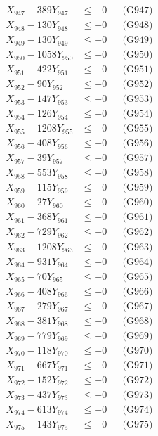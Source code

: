 \documentclass[a4paper,10pt]{article}
\begin{document}
{\begin{align}
X_{947} - 389Y_{947} &\leq +0 && \text{(G947)} \\
X_{948} - 130Y_{948} &\leq +0 && \text{(G948)} \\
X_{949} - 130Y_{949} &\leq +0 && \text{(G949)} \\
X_{950} - 1058Y_{950} &\leq +0 && \text{(G950)} \\
\allowbreak
X_{951} - 422Y_{951} &\leq +0 && \text{(G951)} \\
X_{952} - 90Y_{952} &\leq +0 && \text{(G952)} \\
X_{953} - 147Y_{953} &\leq +0 && \text{(G953)} \\
X_{954} - 126Y_{954} &\leq +0 && \text{(G954)} \\
X_{955} - 1208Y_{955} &\leq +0 && \text{(G955)} \\
X_{956} - 408Y_{956} &\leq +0 && \text{(G956)} \\
X_{957} - 39Y_{957} &\leq +0 && \text{(G957)} \\
X_{958} - 553Y_{958} &\leq +0 && \text{(G958)} \\
X_{959} - 115Y_{959} &\leq +0 && \text{(G959)} \\
X_{960} - 27Y_{960} &\leq +0 && \text{(G960)} \\
\allowbreak
X_{961} - 368Y_{961} &\leq +0 && \text{(G961)} \\
X_{962} - 729Y_{962} &\leq +0 && \text{(G962)} \\
X_{963} - 1208Y_{963} &\leq +0 && \text{(G963)} \\
X_{964} - 931Y_{964} &\leq +0 && \text{(G964)} \\
X_{965} - 70Y_{965} &\leq +0 && \text{(G965)} \\
X_{966} - 408Y_{966} &\leq +0 && \text{(G966)} \\
X_{967} - 279Y_{967} &\leq +0 && \text{(G967)} \\
X_{968} - 381Y_{968} &\leq +0 && \text{(G968)} \\
X_{969} - 779Y_{969} &\leq +0 && \text{(G969)} \\
X_{970} - 118Y_{970} &\leq +0 && \text{(G970)} \\
\allowbreak
X_{971} - 667Y_{971} &\leq +0 && \text{(G971)} \\
X_{972} - 152Y_{972} &\leq +0 && \text{(G972)} \\
X_{973} - 437Y_{973} &\leq +0 && \text{(G973)} \\
X_{974} - 613Y_{974} &\leq +0 && \text{(G974)} \\
X_{975} - 143Y_{975} &\leq +0 && \text{(G975)} \\

\end{align}}
\end{document}

